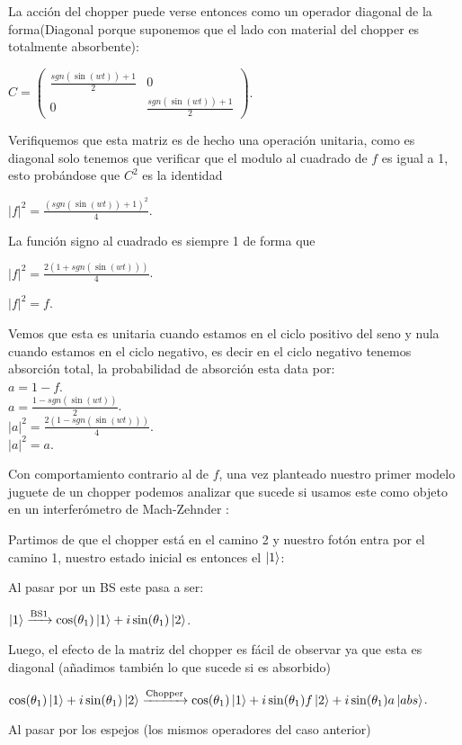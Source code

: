 \documentclass[11pt]{article}
\begin{document}
La acción del chopper
 puede verse entonces como un operador diagonal de la forma(Diagonal porque suponemos que el lado con material del chopper
 es totalmente absorbente):

$C
=\begin
{pmatrix} \frac{sgn
(\sin(wt
))+1}{2} & 0 \\ 0 & \frac{sgn
(\sin(wt
))+1}{2} \end
{pmatrix}$.

Verifiquemos que esta matriz es de hecho una operación unitaria, como es diagonal solo tenemos que verificar que el modulo al cuadrado de $f$
 es igual a 1, esto probándose que $C^2$ es la identidad 

$|f|^2=\frac{(sgn
(\sin(wt
))+1)^2}{4}$.

La función signo al cuadrado es siempre 1 de forma que

$|f|^2=\frac{2(1+sgn
(\sin(wt
)))}{4}$.

$|f|^2=f$.

Vemos que esta es unitaria cuando estamos en el ciclo positivo del seno y nula cuando estamos en el ciclo negativo, es decir en el ciclo negativo tenemos absorción total, la probabilidad de absorción esta data por:
\\
$a
=1-f$.\\
$a
=\frac{1-sgn(\sin(wt
))}{2}$.\\
$|a|^2=\frac{2(1-sgn(\sin(wt
)))}{4}$.\\$|a|^2=a$.

Con comportamiento contrario al de $f$, una vez planteado nuestro primer modelo juguete de un chopper
 podemos analizar que sucede si usamos este como objeto en un interferómetro
 de Mach-Zehnder :

Partimos de que el chopper
 está en el camino 2 y nuestro fotón entra por el camino 1, nuestro estado inicial es entonces el $\ket
{1}$:

Al pasar por un BS este pasa
 a ser:

$\ket{1}\xrightarrow{\text{BS1}}\cos
(\theta_
{1})\ket
{1}+i\sin(\theta_
{1})\ket
{2}$.

Luego, el efecto de la matriz del chopper
 es fácil de observar ya que esta es diagonal (añadimos también lo que sucede si es absorbido)

$\cos
(\theta_
{1})\ket
{1}+i\sin(\theta_
{1})\ket
{2}\xrightarrow{\text{Chopper}}\cos
(\theta_
{1})\ket
{1}+i\sin(\theta_
{1})f\ket
{2}+i\sin(\theta_
{1})a\ket
{abs
}$.

Al pasar por los espejos (los mismos operadores del caso anterior)
\end{document}
